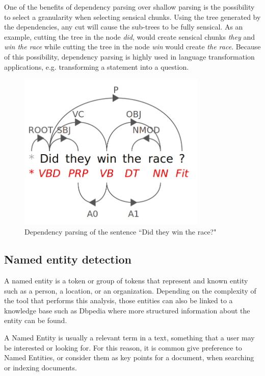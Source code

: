 \documentclass{bsu-ms}
\begin{document}
One of the benefits of dependency parsing over shallow parsing is the possibility to select a granularity when selecting sensical chunks. Using the tree generated by the dependencies, any cut will cause the sub-trees to be fully sensical. As an example, cutting the tree in the node \emph{did}, would create sensical chunks \emph{they} and \emph{win the race} while cutting the tree in the node \emph{win} would create \emph{the race}. Because of this possibility, dependency parsing is highly used in language transformation applications, e.g. transforming a statement into a question.

\begin{figure}[h!]
\centering
\includegraphics[width=0.8\textwidth]{dependency}
\caption{Dependency parsing of the sentence ``Did they win the race?"}
\label{fig:dependency}
\end{figure}

\subsection{Named entity detection}
A named entity is a token or group of tokens that represent and known entity such as a person, a location, or an organization. Depending on the complexity of the tool that performs this analysis, those entities can also be linked to a knowledge base such as Dbpedia \cite{dbpedia} where more structured information about the entity can be found.

A Named Entity is usually a relevant term in a text, something that a user may be interested or looking for. For this reason, it is common give preference to  Named Entities, or consider them as key points for a document, when searching or indexing documents.
\end{document}
